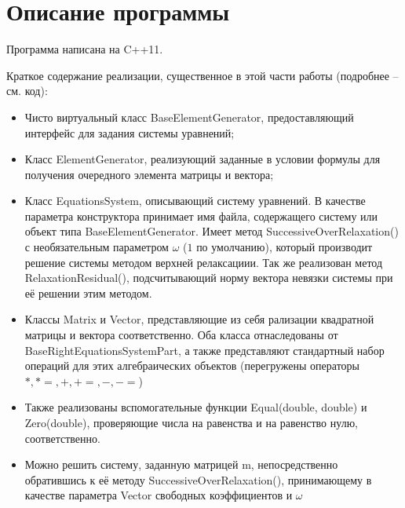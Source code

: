\newpage
\section{Описание программы}
Программа написана на C++11. \par
Краткое содержание реализации, существенное в этой части работы (подробнее -- см. код):
\begin{itemize}
    \item Чисто виртуальный класс BaseElementGenerator, предоставляющий интерфейс для задания системы уравнений;
    \item Класс ElementGenerator, реализующий заданные в условии формулы для получения очередного элемента матрицы и вектора;
    \item Класс EquationsSystem, описывающий систему уравнений. В качестве параметра конструктора принимает имя файла, содержащего систему или объект типа BaseElementGenerator.
        Имеет метод SuccessiveOverRelaxation() с необязательным параметром $\omega$ ($1$ по умолчанию), который производит решение системы методом верхней релаксациии.
        Так же реализован метод RelaxationResidual(), подсчитывающий норму вектора невязки системы при её решении этим методом.
    \item Классы Matrix и Vector, представляющие из себя рализации квадратной матрицы и вектора соответственно. Оба класса отнаследованы от BaseRightEquationsSystemPart, а также 
        представляют стандартный набор операций для этих алгебраических объектов (перегружены операторы $*, *=, +, +=, -, -=$)
    \item Также реализованы вспомогательные функции Equal(double, double) и Zero(double), проверяющие числа на равенства и на равенство нулю, соответственно.
    \item Можно решить систему, заданную матрицей m, непосредственно обратившись к её методу SuccessiveOverRelaxation(), принимающему в качестве параметра Vector свободных коэффициентов
    и $\omega$
\end{itemize}
